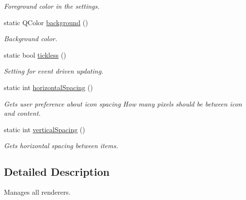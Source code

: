 \begin{DoxyCompactItemize}
\begin{DoxyCompactList}\small\item\em \-Foreground color in the settings. \end{DoxyCompactList}\item 
static \-Q\-Color \hyperlink{classRendererManager_ab84b4d4ac26799c820ead5385d36dc5b}{background} ()
\begin{DoxyCompactList}\small\item\em \-Background color. \end{DoxyCompactList}\item 
\hypertarget{classRendererManager_ae3ec1d6d336fc58b483b231b098bf640}{
static bool \hyperlink{classRendererManager_ae3ec1d6d336fc58b483b231b098bf640}{tickless} ()}
\label{classRendererManager_ae3ec1d6d336fc58b483b231b098bf640}

\begin{DoxyCompactList}\small\item\em \-Setting for event driven updating. \end{DoxyCompactList}\item 
\hypertarget{classRendererManager_a19ba613b59633b6d53b38cfd0ba01c30}{
static int \hyperlink{classRendererManager_a19ba613b59633b6d53b38cfd0ba01c30}{horizontal\-Spacing} ()}
\label{classRendererManager_a19ba613b59633b6d53b38cfd0ba01c30}

\begin{DoxyCompactList}\small\item\em \-Gets user preference about icon spacing \-How many pixels should be between icon and content. \end{DoxyCompactList}\item 
\hypertarget{classRendererManager_a9b0dc0d93b9b23682a4b514e71db24af}{
static int \hyperlink{classRendererManager_a9b0dc0d93b9b23682a4b514e71db24af}{vertical\-Spacing} ()}
\label{classRendererManager_a9b0dc0d93b9b23682a4b514e71db24af}

\begin{DoxyCompactList}\small\item\em \-Gets horizontal spacing between items. \end{DoxyCompactList}\end{DoxyCompactItemize}


\subsection{\-Detailed \-Description}
\-Manages all renderers. 

